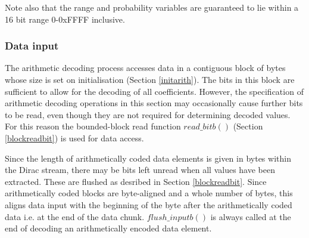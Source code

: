 \begin{informative}
Note also that the range and probability variables are guaranteed to lie within a 16 bit range 0-0xFFFF
inclusive.
\end{informative}

\subsubsection{Data input}
\label{inputarith}

The arithmetic decoding process accesses data in a contiguous block of bytes
whose size is set on initialisation (Section \ref{initarith}). The bits in this
block are sufficient to allow for the
decoding of all coefficients. However, the specification of arithmetic
decoding operations in this section may occasionally cause further bits to be read,
even though they are not required for determining decoded values. For this
reason the bounded-block read function $read\_bitb()$ (Section \ref{blockreadbit}) is 
used for data access.

Since the length of arithmetically coded data elements is given in bytes within the Dirac
stream, there may be bits left unread when all values have been extracted. These
are flushed as desribed in Section \ref{blockreadbit}. Since arithmetically coded blocks
are byte-aligned and a whole number of bytes, this aligns data input with the beginning of the byte 
after the arithmetically coded data i.e. at the end of the
data chunk. $flush\_inputb()$ is always called at the end of decoding an arithmetically encoded
data element.

\begin{comment}
\begin{informative}
The Dirac arithmetic decoding engine uses 16 bit words, and so if all coefficients are
coded no more than 16 additional bits should be read beyond the end of the block. Hence it 
would seem sufficient to read in the entire block of data and pad the end with two bytes of value 0xFF,
to avoid a branch condition on inputting data
However, an arithmetically encoded block may end with a string of 1s, which an encoder could
conceivably strip out to save bits, in the knowledge that $read\_bitb()$ will re-insert them. Terminating
strings of 1s can occur (but not exclusively) in coding many zero wavelet subband coefficients at the end
of a subband. So a larger number of pad bytes may be required in practice.
\end{informative}
\end{comment}

